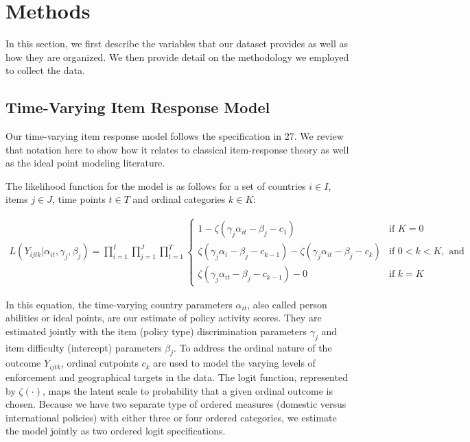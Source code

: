 \documentclass[
]{article}
\begin{document}
\hypertarget{methods}{%
\section*{Methods}\label{methods}}

In this section, we first describe the variables that our dataset provides as well as how they are organized. We then provide detail on the methodology we employed to collect the data.

\hypertarget{time-varying-item-response-model}{%
\subsection*{Time-Varying Item Response Model}\label{time-varying-item-response-model}}

Our time-varying item response model follows the specification in 27. We review that notation here to show how it relates to classical item-response theory as well as the ideal point modeling literature.

The likelihood function for the model is as follows for a set of countries \(i \in I\), items \(j \in J\), time points \(t \in T\) and ordinal categories \(k \in K\):

\begin{align}
    L(Y_{ijtk}|\alpha_{it},\gamma_j,\beta_j) =  \prod_{i=1}^{I} \prod_{j=1}^{J} \prod_{t=1}^{T}
    \begin{cases} 
    1 -  \zeta(\gamma_j \alpha_{it} - \beta_j - c_1) & \text{if } K = 0 \\
    \zeta(\gamma_j \alpha_i - \beta_j - c_{k-1}) - \zeta(\gamma_j \alpha_{it} - \beta_j - c_{k})       & \text{if } 0 < k < K, \text{ and} \\
    \zeta(\gamma_j \alpha_{it} - \beta_j - c_{k-1}) - 0 & \text{if } k=K
    \end{cases}
\label{eq:basic}
\end{align}

In this equation, the time-varying country parameters \(\alpha_{it}\), also called person abilities or ideal points, are our estimate of policy activity scores. They are estimated jointly with the item (policy type) discrimination parameters \(\gamma_j\) and item difficulty (intercept) parameters \(\beta_j\). To address the ordinal nature of the outcome \(Y_{ijtk}\), ordinal cutpoints \(c_{k}\) are used to model the varying levels of enforcement and geographical targets in the data. The logit function, represented by \(\zeta(\cdot)\), maps the latent scale to probability that a given ordinal outcome is chosen. Because we have two separate type of ordered measures (domestic versus international policies) with either three or four ordered categories, we estimate the model jointly as two ordered logit specifications.
\end{document}
